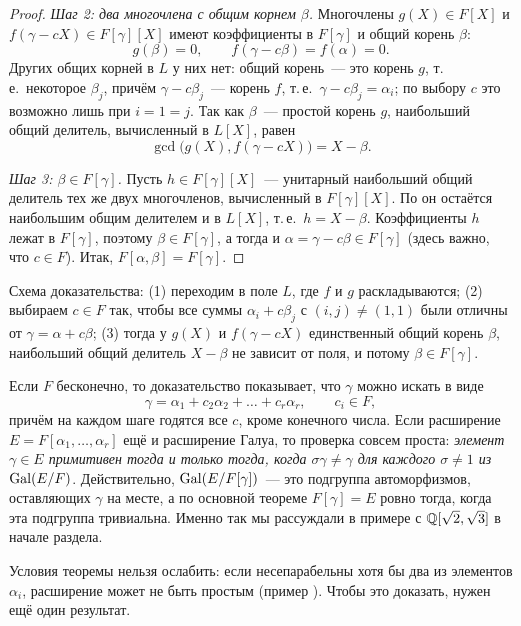 \begin{proof}
\emph{Шаг 2: два многочлена с общим корнем $\beta$.} Многочлены $g(X)\in F[X]$ и $f(\gamma-cX)\in F[\gamma][X]$ имеют
коэффициенты в $F[\gamma]$ и общий корень $\beta$:
\[
g(\beta)=0,\qquad f(\gamma-c\beta)=f(\alpha)=0.
\]
Других общих корней в $L$ у них нет: общий корень~--- это корень $g$, т.\,е.\ некоторое $\beta_j$, причём
$\gamma-c\beta_j$~--- корень $f$, т.\,е.\ $\gamma-c\beta_j=\alpha_i$; по выбору $c$ это возможно лишь при $i=1=j$. Так как
$\beta$~--- простой корень $g$, наибольший общий делитель, вычисленный в $L[X]$, равен
\[
\gcd\bigl(g(X),f(\gamma-cX)\bigr)=X-\beta.
\]

\emph{Шаг 3: $\beta\in F[\gamma]$.} Пусть $h\in F[\gamma][X]$~--- унитарный наибольший общий делитель тех же двух
многочленов, вычисленный в $F[\gamma][X]$. По  он остаётся наибольшим общим делителем и в $L[X]$, т.\,е.\ $h=X-\beta$.
Коэффициенты $h$ лежат в $F[\gamma]$, поэтому $\beta\in F[\gamma]$, а тогда и $\alpha=\gamma-c\beta\in F[\gamma]$
(здесь важно, что $c\in F$). Итак, $F[\alpha,\beta]=F[\gamma]$.
\end{proof}

Схема доказательства: (1) переходим в поле $L$, где $f$ и $g$ раскладываются; (2) выбираем $c\in F$ так, чтобы все
суммы $\alpha_i+c\beta_j$ с $(i,j)\ne(1,1)$ были отличны от $\gamma=\alpha+c\beta$; (3) тогда у $g(X)$ и $f(\gamma-cX)$ единственный общий корень
$\beta$, наибольший общий делитель $X-\beta$ не зависит от поля, и потому $\beta\in F[\gamma]$.

\begin{remark}[5.2]
Если $F$ бесконечно, то доказательство показывает, что $\gamma$ можно искать в виде
\[
\gamma=\alpha_1+c_2\alpha_2+\dots+c_r\alpha_r,\qquad c_i\in F,
\]
причём на каждом шаге годятся все $c$, кроме конечного числа. Если расширение $E=F[\alpha_1,\dots,\alpha_r]$ ещё и
расширение Галуа, то проверка совсем проста: \emph{элемент $\gamma\in E$ примитивен тогда и только тогда, когда
$\sigma\gamma\ne\gamma$ для каждого $\sigma\ne1$ из $\operatorname{Gal}(E/F)$}. Действительно, $\operatorname{Gal}(E/F[\gamma])$~--- это подгруппа
автоморфизмов, оставляющих $\gamma$ на месте, а по основной теореме $F[\gamma]=E$ ровно тогда, когда эта подгруппа
тривиальна. Именно так мы рассуждали в примере с $\mathbb Q[\sqrt2,\sqrt3]$ в начале раздела.

Условия теоремы нельзя ослабить: если несепарабельны хотя бы два из элементов $\alpha_i$, расширение может не быть
простым (пример ). Чтобы это доказать, нужен ещё один результат.
\end{remark}

